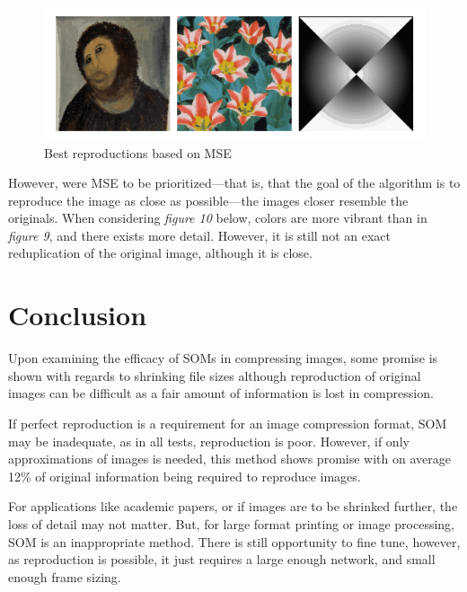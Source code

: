 \documentclass[a4paper,12pt]{article}
\begin{document}
\begin{figure}[h!]
\centering
\includegraphics[scale=0.50]{images/bestmse.png}
\caption{Best reproductions based on MSE}
\label{fig:bestmse}
\end{figure}

However, were MSE to be prioritized---that is, that the goal of the algorithm is to reproduce the image as close as possible---the images closer resemble the originals. When considering \textit{figure 10} below, colors are more vibrant than in \textit{figure 9}, and there exists more detail. However, it is still not an exact reduplication of the original image, although it is close.

\section{Conclusion}

Upon examining the efficacy of SOMs in compressing images, some promise is shown with regards to shrinking file sizes although reproduction of original images can be difficult as a fair amount of information is lost in compression.

If perfect reproduction is a requirement for an image compression format, SOM may be inadequate, as in all tests, reproduction is poor. However, if only approximations of images is needed, this method shows promise with on average 12\% of original information being required to reproduce images.

For applications like academic papers, or if images are to be shrinked further, the loss of detail may not matter. But, for large format printing or image processing, SOM is an inappropriate method. There is still opportunity to fine tune, however, as reproduction is possible, it just requires a large enough network, and small enough frame sizing.
\end{document}
